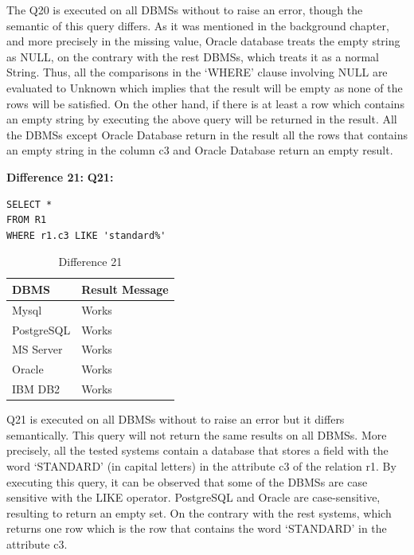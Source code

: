 The Q20 is executed on all DBMSs without to raise an error, though the semantic of this query differs. As it was mentioned in the background chapter, and more precisely in the missing value, Oracle database treats the empty string as NULL, on the contrary with the rest DBMSs, which treats it as a normal String. Thus, all the comparisons in the ‘WHERE’ clause involving NULL are evaluated to Unknown which implies that the result will be empty as none of the rows will be satisfied.  On the other hand, if there is at least a row which contains an empty string by executing the above query will be returned in the result. All the DBMSs except Oracle Database return in the result all the rows that contains an empty string in the column c3 and Oracle Database return an empty result. 



\hfill\newline\textbf{Difference 21:}
\hfill\newline\textbf{Q21:}

\begin{mdframed}[backgroundcolor=lightgray!20]
\begin{lstlisting}[style=SQL]
SELECT *
FROM R1
WHERE r1.c3 LIKE 'standard%'
\end{lstlisting}
\end{mdframed}


\begin{table}[h]
\centering
\caption{Difference 21}
\label{my-label}
\begin{tabular}{|p{2cm}|p{11.5cm}| }
\hline
\textbf{DBMS} & \textbf{Result Message} \\ \hline
Mysql         & Works                   \\ \hline
PostgreSQL    & Works                   \\ \hline
MS Server     & Works                   \\ \hline
Oracle        & Works                   \\ \hline
IBM DB2       & Works                   \\ \hline
\end{tabular}
\end{table}

Q21 is executed on all DBMSs without to raise an error but it differs semantically.  This query will not return the same results on all DBMSs. More precisely, all the tested systems contain a database that stores a field with the word ‘STANDARD’ (in capital letters) in the attribute c3 of the relation r1. By executing this query, it can be observed that some of the DBMSs are case sensitive with the LIKE operator. PostgreSQL and Oracle are case-sensitive, resulting to return an empty set. On the contrary with the rest systems, which returns one row which is the row that contains the word ‘STANDARD’ in the attribute c3.  




